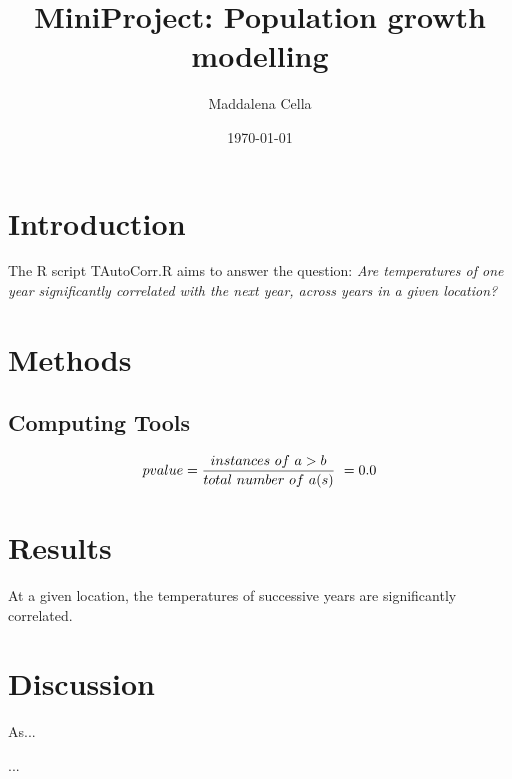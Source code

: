 \documentclass[11pt,letterpaper] {article}
\title {MiniProject: Population growth modelling}
\author {Maddalena Cella}
\date {\today}
\begin{document}
  \maketitle

  \section{Introduction}
  The R script TAutoCorr.R aims to answer the question: \textit{Are temperatures of one year significantly 
  correlated with the next year, across years in a given location?} 

  \section{Methods}
  
  \subsection{Computing Tools}


  \begin{equation*}
    pvalue = \frac{instances\ of\ a > b}{total\ number\ of\ a(s)}\ = 0.0\\
  \end{equation*}

  \section{Results}
  At a given location, the temperatures of successive years are significantly correlated.
  
  \section{Discussion}
  As...
  
  
  
  ...
\end{document}
